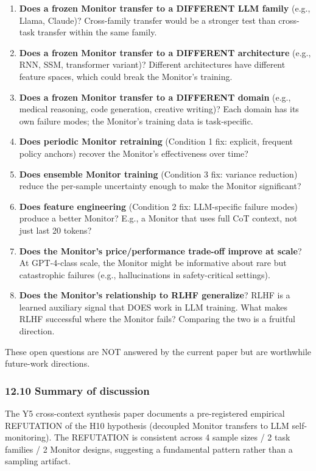 \documentclass[
]{article}
\begin{document}
\begin{enumerate}
\def\labelenumi{\arabic{enumi}.}
\item
  \textbf{Does a frozen Monitor transfer to a DIFFERENT LLM family}
  (e.g., Llama, Claude)? Cross-family transfer would be a stronger test
  than cross-task transfer within the same family.
\item
  \textbf{Does a frozen Monitor transfer to a DIFFERENT architecture}
  (e.g., RNN, SSM, transformer variant)? Different architectures have
  different feature spaces, which could break the Monitor's training.
\item
  \textbf{Does a frozen Monitor transfer to a DIFFERENT domain} (e.g.,
  medical reasoning, code generation, creative writing)? Each domain has
  its own failure modes; the Monitor's training data is task-specific.
\item
  \textbf{Does periodic Monitor retraining} (Condition 1 fix: explicit,
  frequent policy anchors) recover the Monitor's effectiveness over
  time?
\item
  \textbf{Does ensemble Monitor training} (Condition 3 fix: variance
  reduction) reduce the per-sample uncertainty enough to make the
  Monitor significant?
\item
  \textbf{Does feature engineering} (Condition 2 fix: LLM-specific
  failure modes) produce a better Monitor? E.g., a Monitor that uses
  full CoT context, not just last 20 tokens?
\item
  \textbf{Does the Monitor's price/performance trade-off improve at
  scale}? At GPT-4-class scale, the Monitor might be informative about
  rare but catastrophic failures (e.g., hallucinations in
  safety-critical settings).
\item
  \textbf{Does the Monitor's relationship to RLHF generalize}? RLHF is a
  learned auxiliary signal that DOES work in LLM training. What makes
  RLHF successful where the Monitor fails? Comparing the two is a
  fruitful direction.
\end{enumerate}

These open questions are NOT answered by the current paper but are
worthwhile future-work directions.

\subsubsection{12.10 Summary of discussion}\label{summary-of-discussion}

The Y5 cross-context synthesis paper documents a pre-registered
empirical REFUTATION of the H10 hypothesis (decoupled Monitor transfers
to LLM self- monitoring). The REFUTATION is consistent across 4 sample
sizes / 2 task families / 2 Monitor designs, suggesting a fundamental
pattern rather than a sampling artifact.
\end{document}
